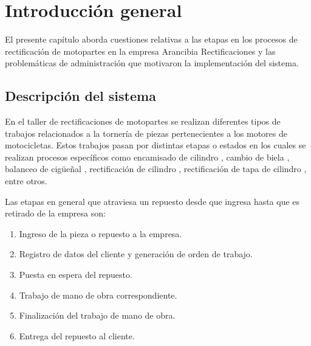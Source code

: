 
\chapter{Introducción general} %

\label{Chapter1} %
\label{IntroGeneral}


\newcommand{\keyword}[1]{\textbf{#1}}
\newcommand{\tabhead}[1]{\textbf{#1}}
\newcommand{\code}[1]{\texttt{#1}}
\newcommand{\file}[1]{\texttt{\bfseries#1}}
\newcommand{\option}[1]{\texttt{\itshape#1}}
\newcommand{\grados}{$^{\circ}$}

El presente capítulo aborda cuestiones relativas a las etapas en los procesos de rectificación de motopartes en la empresa Arancibia Rectificaciones y las problemáticas de administración que motivaron la implementación del sistema.  



\section{Descripción del sistema}

En el taller de rectificaciones de motopartes se realizan diferentes tipos de trabajos relacionados a la tornería \citep{ARTICLE:TORNERIA} de piezas pertenecientes a los motores de motocicletas. Estos trabajos pasan por distintas etapas o estados en los cuales se realizan procesos específicos como encamisado de cilindro \citep{WEBSITE:MECANICA}, cambio de biela \citep{ARTICLE:BIELA}, balanceo de cigüeñal \citep{BOOK:CIGUEÑAL}, rectificación de cilindro \citep{BOOK:MECANICA}, rectificación de tapa de cilindro \citep{BOOK:TAPA}, entre otros. 


Las etapas en general que atraviesa un repuesto desde que ingresa hasta que es retirado de la empresa son:
\begin{enumerate}
\item Ingreso de la pieza o repuesto a la empresa. 	
\item Registro de datos del cliente y generación de orden de trabajo.
\item Puesta en espera del repuesto.
\item Trabajo de mano de obra correspondiente.
\item Finalización del trabajo de mano de obra.
\item Entrega del repuesto al cliente.
\end{enumerate}

